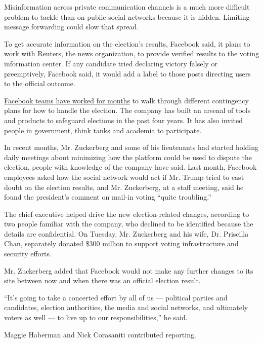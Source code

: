 Misinformation across private communication channels is a much more
difficult problem to tackle than on public social networks because it is
hidden. Limiting message forwarding could slow that spread.

To get accurate information on the election's results, Facebook said, it
plans to work with Reuters, the news organization, to provide verified
results to the voting information center. If any candidate tried
declaring victory falsely or preemptively, Facebook said, it would add a
label to those posts directing users to the official outcome.

\href{https://www.nytimes3xbfgragh.onion/2020/08/21/technology/facebook-trump-election.html}{Facebook
teams have worked for months} to walk through different contingency
plans for how to handle the election. The company has built an arsenal
of tools and products to safeguard elections in the past four years. It
has also invited people in government, think tanks and academia to
participate.

In recent months, Mr. Zuckerberg and some of his lieutenants had started
holding daily meetings about minimizing how the platform could be used
to dispute the election, people with knowledge of the company have said.
Last month, Facebook employees asked how the social network would act if
Mr. Trump tried to cast doubt on the election results, and Mr.
Zuckerberg, at a staff meeting, said he found the president's comment on
mail-in voting ``quite troubling.''

The chief executive helped drive the new election-related changes,
according to two people familiar with the company, who declined to be
identified because the details are confidential. On Tuesday, Mr.
Zuckerberg and his wife, Dr. Priscilla Chan, separately
\href{https://www.axios.com/mark-zuckerberg-priscilla-chan-election-security-a4950a93-2efd-42a6-9d7a-5fcc763f9214.html}{donated
\$300 million} to support voting infrastructure and security efforts.

Mr. Zuckerberg added that Facebook would not make any further changes to
its site between now and when there was an official election result.

``It's going to take a concerted effort by all of us --- political
parties and candidates, election authorities, the media and social
networks, and ultimately voters as well --- to live up to our
responsibilities,'' he said.

Maggie Haberman and Nick Corasaniti contributed reporting.

